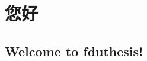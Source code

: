 \documentclass{fduthesis}
\begin{document}
\chapter{您好}
\section{Welcome to fduthesis!}
\cite{test1}
\zhlipsum[1]

\cite{lyp,kanamori,zbw}
\zhlipsum[2]

\cite{mgfckysxh,lyp,zhrmghggwyxwbgs}
\zhlipsum[2]

\printbibliography
\end{document}
